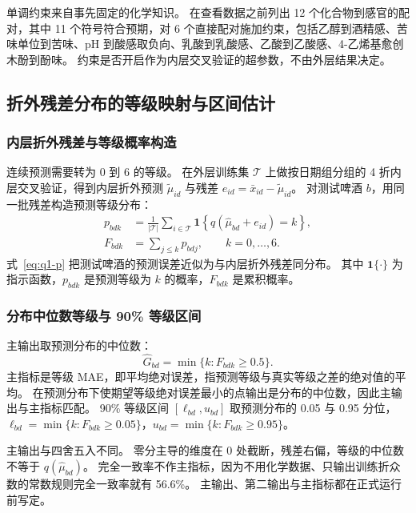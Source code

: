 单调约束来自事先固定的化学知识。
在查看数据之前列出 12 个化合物到感官的配对，其中 11 个符号符合预期，对 6 个直接配对施加约束，包括乙醇到酒精感、苦味单位到苦味、pH 到酸感取负向、乳酸到乳酸感、乙酸到乙酸感、4-乙烯基愈创木酚到酚味。
约束是否开启作为内层交叉验证的超参数，不由外层结果决定。

\subsection{折外残差分布的等级映射与区间估计}

\subsubsection{内层折外残差与等级概率构造}

连续预测需要转为 0 到 6 的等级。
在外层训练集 $\mathcal T$ 上做按日期组分组的 4 折内层交叉验证，得到内层折外预测 $\tilde\mu_{id}$ 与残差 $e_{id}=\bar x_{id}-\tilde\mu_{id}$。
对测试啤酒 $b$，用同一批残差构造预测等级分布：
\begin{equation}\label{eq:q1-p}
\begin{aligned}
p_{bdk}&=\frac{1}{|\mathcal T|}\sum_{i\in\mathcal T}\mathbf 1\!\left\{q(\hat\mu_{bd}+e_{id})=k\right\},\\
F_{bdk}&=\sum_{j\le k}p_{bdj},\qquad k=0,\dots,6 .
\end{aligned}
\end{equation}
式~\eqref{eq:q1-p} 把测试啤酒的预测误差近似为与内层折外残差同分布。
其中 $\mathbf 1\{\cdot\}$ 为指示函数，$p_{bdk}$ 是预测等级为 $k$ 的概率，$F_{bdk}$ 是累积概率。

\subsubsection{分布中位数等级与 90\% 等级区间}

主输出取预测分布的中位数：
\begin{equation}\label{eq:q1-median}
\hat G_{bd}=\min\{k: F_{bdk}\ge 0.5\}.
\end{equation}
主指标是等级 MAE，即平均绝对误差，指预测等级与真实等级之差的绝对值的平均。
在预测分布下使期望等级绝对误差最小的点输出是分布的中位数，因此主输出与主指标匹配。
90\% 等级区间 $[\ell_{bd},u_{bd}]$ 取预测分布的 0.05 与 0.95 分位，$\ell_{bd}=\min\{k:F_{bdk}\ge0.05\}$，$u_{bd}=\min\{k:F_{bdk}\ge0.95\}$。

主输出与四舍五入不同。
零分主导的维度在 0 处截断，残差右偏，等级的中位数不等于 $q(\hat\mu_{bd})$。
完全一致率不作主指标，因为不用化学数据、只输出训练折众数的常数规则完全一致率就有 56.6\%。
主输出、第二输出与主指标都在正式运行前写定。

